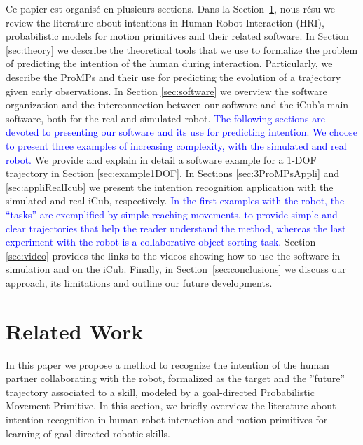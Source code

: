 \documentclass[utf8]{frontiersSCNS} %
\newcommand{\rev}[1]{\textcolor{blue}{#1}}
\begin{document}
Ce papier est organisé en plusieurs sections.
Dans la Section~\ref{sec:SOA}, nous résu we review the literature about intentions in Human-Robot Interaction (HRI), probabilistic models for motion primitives and their related software. 
In Section \ref{sec:theory} we describe the theoretical tools that we use to formalize the problem of predicting the intention of the human during interaction. Particularly, we describe the ProMPs and their use for predicting the evolution of a trajectory given early observations. 
In Section \ref{sec:software} we overview the software organization and the interconnection between our software and the iCub's main software, both for the real and simulated robot.
\rev{The following sections are devoted to presenting our software and its use for predicting intention. We choose to present three examples of increasing complexity, with the simulated and real robot.}
We provide and explain in detail a software example for a 1-DOF trajectory in Section \ref{sec:example1DOF}.
In  Sections \ref{sec:3ProMPsAppli} and \ref{sec:appliRealIcub} we present the intention recognition application with the simulated and real iCub, respectively.
\rev{In the first examples with the robot, the ``tasks'' are exemplified by simple reaching movements, to provide simple and clear trajectories that help the reader understand the method, whereas the last experiment with the robot is a collaborative object sorting task.}
Section \ref{sec:video} provides the links to the videos showing how to use the software in simulation and on the iCub.
Finally, in Section~\ref{sec:conclusions} we discuss our approach, its limitations and outline our future developments.

\section{Related Work}\label{sec:SOA}



In this paper we propose a method to recognize the intention of the human partner collaborating with the robot, formalized as the target and the ''future'' trajectory associated to a skill, modeled by a goal-directed Probabilistic Movement Primitive.   
In this section, we briefly overview the literature about intention recognition in human-robot interaction and motion primitives for  learning of goal-directed robotic skills.
\end{document}
